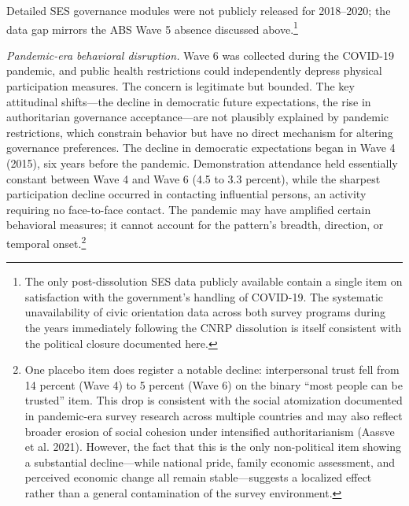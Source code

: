 \documentclass[
  12pt,
  letterpaper]{article}
\begin{document}
Detailed SES governance modules were not publicly released for
2018--2020; the data gap mirrors the ABS Wave 5 absence discussed
above.\footnote{The only post-dissolution SES data publicly available
  contain a single item on satisfaction with the government's handling
  of COVID-19. The systematic unavailability of civic orientation data
  across both survey programs during the years immediately following the
  CNRP dissolution is itself consistent with the political closure
  documented here.}

\emph{Pandemic-era behavioral disruption.} Wave 6 was collected during
the COVID-19 pandemic, and public health restrictions could
independently depress physical participation measures. The concern is
legitimate but bounded. The key attitudinal shifts---the decline in
democratic future expectations, the rise in authoritarian governance
acceptance---are not plausibly explained by pandemic restrictions, which
constrain behavior but have no direct mechanism for altering governance
preferences. The decline in democratic expectations began in Wave 4
(2015), six years before the pandemic. Demonstration attendance held
essentially constant between Wave 4 and Wave 6 (4.5 to 3.3 percent),
while the sharpest participation decline occurred in contacting
influential persons, an activity requiring no face-to-face contact. The
pandemic may have amplified certain behavioral measures; it cannot
account for the pattern's breadth, direction, or temporal
onset.\footnote{One placebo item does register a notable decline:
  interpersonal trust fell from 14 percent (Wave 4) to 5 percent (Wave
  6) on the binary ``most people can be trusted'' item. This drop is
  consistent with the social atomization documented in pandemic-era
  survey research across multiple countries and may also reflect broader
  erosion of social cohesion under intensified authoritarianism (Aassve
  et al. 2021). However, the fact that this is the only non-political
  item showing a substantial decline---while national pride, family
  economic assessment, and perceived economic change all remain
  stable---suggests a localized effect rather than a general
  contamination of the survey environment.}
\end{document}
